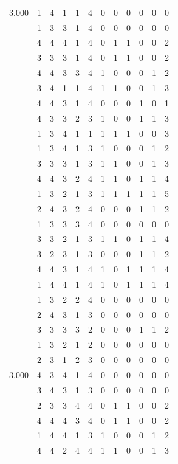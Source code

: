 \documentclass[]{msu-thesis}
\theoremstyle{definition}
\theoremstyle{definition}
\theoremstyle{definition}
\theoremstyle{remark}
\begin{document}
\begin{table}
{\begin{tabular}[t]{rrrrrrrrrrrr}
3.000 & 1 & 4 & 1 & 1 & 4 & 0 & 0 & 0 & 0 & 0 & 0\\
 & 1 & 3 & 3 & 1 & 4 & 0 & 0 & 0 & 0 & 0 & 0\\
 & 4 & 4 & 4 & 1 & 4 & 0 & 1 & 1 & 0 & 0 & 2\\
 & 3 & 3 & 3 & 1 & 4 & 0 & 1 & 1 & 0 & 0 & 2\\
 & 4 & 4 & 3 & 3 & 4 & 1 & 0 & 0 & 0 & 1 & 2\\
 & 3 & 4 & 1 & 1 & 4 & 1 & 1 & 0 & 0 & 1 & 3\\
 & 4 & 4 & 3 & 1 & 4 & 0 & 0 & 0 & 1 & 0 & 1\\
 & 4 & 3 & 3 & 2 & 3 & 1 & 0 & 0 & 1 & 1 & 3\\
 & 1 & 3 & 4 & 1 & 1 & 1 & 1 & 1 & 0 & 0 & 3\\
 & 1 & 3 & 4 & 1 & 3 & 1 & 0 & 0 & 0 & 1 & 2\\
 & 3 & 3 & 3 & 1 & 3 & 1 & 1 & 0 & 0 & 1 & 3\\
 & 4 & 4 & 3 & 2 & 4 & 1 & 1 & 0 & 1 & 1 & 4\\
 & 1 & 3 & 2 & 1 & 3 & 1 & 1 & 1 & 1 & 1 & 5\\
 & 2 & 4 & 3 & 2 & 4 & 0 & 0 & 0 & 1 & 1 & 2\\
 & 1 & 3 & 3 & 3 & 4 & 0 & 0 & 0 & 0 & 0 & 0\\
 & 3 & 3 & 2 & 1 & 3 & 1 & 1 & 0 & 1 & 1 & 4\\
 & 3 & 2 & 3 & 1 & 3 & 0 & 0 & 0 & 1 & 1 & 2\\
 & 4 & 4 & 3 & 1 & 4 & 1 & 0 & 1 & 1 & 1 & 4\\
 & 1 & 4 & 4 & 1 & 4 & 1 & 0 & 1 & 1 & 1 & 4\\
 & 1 & 3 & 2 & 2 & 4 & 0 & 0 & 0 & 0 & 0 & 0\\
 & 2 & 4 & 3 & 1 & 3 & 0 & 0 & 0 & 0 & 0 & 0\\
 & 3 & 3 & 3 & 3 & 2 & 0 & 0 & 0 & 1 & 1 & 2\\
 & 1 & 3 & 2 & 1 & 2 & 0 & 0 & 0 & 0 & 0 & 0\\
 & 2 & 3 & 1 & 2 & 3 & 0 & 0 & 0 & 0 & 0 & 0\\
3.000 & 4 & 3 & 4 & 1 & 4 & 0 & 0 & 0 & 0 & 0 & 0\\
 & 3 & 4 & 3 & 1 & 3 & 0 & 0 & 0 & 0 & 0 & 0\\
 & 2 & 3 & 3 & 4 & 4 & 0 & 1 & 1 & 0 & 0 & 2\\
 & 4 & 4 & 4 & 3 & 4 & 0 & 1 & 1 & 0 & 0 & 2\\
 & 1 & 4 & 4 & 1 & 3 & 1 & 0 & 0 & 0 & 1 & 2\\
 & 4 & 4 & 2 & 4 & 4 & 1 & 1 & 0 & 0 & 1 & 3\\

\end{tabular}}
\end{table}
\end{document}

